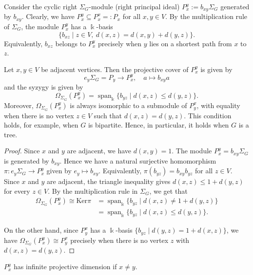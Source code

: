 \documentclass[a4paper,leqno]{amsart}
\begin{document}
Consider the cyclic right $\Sigma_G$-module (right principal ideal) $P_x^y:=b_{xy}\Sigma_G$ generated by $b_{xy}$. 
Clearly, we have $P_x^y\subseteq P_x^x=:P_x$ for all $x,y\in V$.
By the multiplication rule of $\Sigma_G$, the module $P_x^y$ has a $\Bbbk$-basis
$$\{b_{xz}\mid z\in V,\ d(x,z)=d(x,y)+d(y,z)\}.$$
Equivalently, $b_{xz}$ belongs to $P_x^y$ precisely when $y$ lies on a shortest path from $x$ to $z$.

\begin{lem}\label{lem:syzygy}
Let $x,y\in V$ be adjacent vertices. Then the projective cover of $P_x^y$ is given by
$$e_y\Sigma_G=P_y\rightarrow P_x^y,\quad a\mapsto b_{xy}a$$
and the syzygy is given by
$$\Omega_{\Sigma_G}(P_x^y)=\operatorname{span}_{\Bbbk}\{b_{yz}\mid d(x,z)\leq d(y,z)\}.$$
Moreover, $\Omega_{\Sigma_G}(P_x^y)$ is always isomorphic to a submodule of $P_y^x$, with equality when  there is no vertex $z\in V$ such that $d(x,z)=d(y,z)$.  This condition holds, for example, when $G$ is bipartite. Hence, in particular, it holds when $G$ is a tree.
\end{lem}

\begin{proof}
Since $x$ and $y$ are adjacent, we have $d(x,y)=1$. The module $P_x^y=b_{xy}\Sigma_G$ is generated by $b_{xy}$. Hence we have a natural surjective homomorphism
$\pi:e_y\Sigma_G\rightarrow P_x^y$ given by $e_y\mapsto b_{xy}$.
Equivalently, $\pi(b_{yz})=b_{xy}b_{yz}$ for all $z\in V$. 
Since $x$ and $y$ are adjacent, the triangle inequality gives $d(x,z)\leq 1+d(y,z)$ for every $z\in V$.
By the multiplication rule in $\Sigma_G$, we get that
\begin{align*}
\Omega_{\Sigma_G}(P_x^y)\cong\mathrm{Ker}\pi&=\operatorname{span}_{\Bbbk}\{b_{yz}\mid d(x,z)\neq 1+d(y,z)\}\\
&=\operatorname{span}_{\Bbbk}\{b_{yz}\mid d(x,z)\leq d(y,z)\}. 
\end{align*}

On the other hand, since $P_y^x$ has a $\Bbbk$-basis $\{b_{yz}\mid d(y,z)=1+d(x,z)\}$, we have  $\Omega_{\Sigma_G}(P_x^y)\cong P_y^x$ precisely when there is no vertex $z$ with $d(x,z)=d(y,z)$.
\end{proof}


\begin{prop}\label{prop:pdim Pxy}\label{prop:gldim-infity}
    $P_x^y$ has infinite projective dimension if $x\neq y$.
\end{prop}
\end{document}
